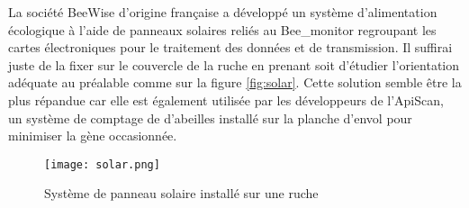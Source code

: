 La société BeeWise d'origine française a développé un système d'alimentation écologique à l'aide de panneaux solaires reliés au Bee_monitor regroupant les cartes électroniques pour le traitement des données et de transmission. Il suffirai juste de la fixer sur le couvercle de la ruche en prenant soit d'étudier l'orientation adéquate au préalable comme sur la figure \ref{fig:solar}. Cette solution semble être la plus répandue car elle est également utilisée par les développeurs de l'ApiScan, un système de comptage de d'abeilles installé sur la planche d'envol pour minimiser la gène occasionnée.    

\begin{figure}[h]
\centering\texttt{[image: solar.png]}
\caption{\label{fig:app} Système de panneau solaire installé sur une ruche}
\end{figure} 

   